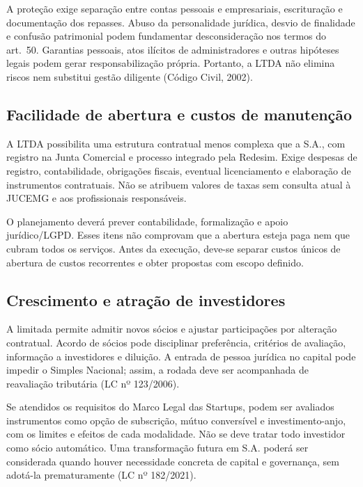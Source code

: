 A proteção exige separação entre contas pessoais e empresariais, escrituração e documentação dos repasses. Abuso da personalidade jurídica, desvio de finalidade e confusão patrimonial podem fundamentar desconsideração nos termos do art.~50. Garantias pessoais, atos ilícitos de administradores e outras hipóteses legais podem gerar responsabilização própria. Portanto, a LTDA não elimina riscos nem substitui gestão diligente (Código Civil, 2002).

\subsection{Facilidade de abertura e custos de manutenção}
A LTDA possibilita uma estrutura contratual menos complexa que a S.A., com registro na Junta Comercial e processo integrado pela Redesim. Exige despesas de registro, contabilidade, obrigações fiscais, eventual licenciamento e elaboração de instrumentos contratuais. Não se atribuem valores de taxas sem consulta atual à JUCEMG e aos profissionais responsáveis.

O planejamento deverá prever contabilidade, formalização e apoio jurídico/LGPD. Esses itens não comprovam que a abertura esteja paga nem que cubram todos os serviços. Antes da execução, deve-se separar custos únicos de abertura de custos recorrentes e obter propostas com escopo definido.

\subsection{Crescimento e atração de investidores}
A limitada permite admitir novos sócios e ajustar participações por alteração contratual. Acordo de sócios pode disciplinar preferência, critérios de avaliação, informação a investidores e diluição. A entrada de pessoa jurídica no capital pode impedir o Simples Nacional; assim, a rodada deve ser acompanhada de reavaliação tributária (LC nº 123/2006).

Se atendidos os requisitos do Marco Legal das Startups, podem ser avaliados instrumentos como opção de subscrição, mútuo conversível e investimento-anjo, com os limites e efeitos de cada modalidade. Não se deve tratar todo investidor como sócio automático. Uma transformação futura em S.A. poderá ser considerada quando houver necessidade concreta de capital e governança, sem adotá-la prematuramente (LC nº 182/2021).